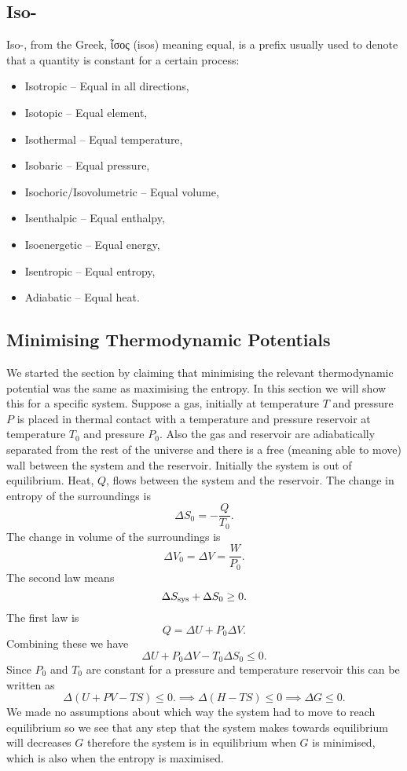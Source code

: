     \subsection{Iso-}
    Iso-, from the Greek, \textgreek{ἶσος} (isos) meaning equal, is a prefix usually used to denote that a quantity is constant for a certain process:
    \begin{itemize}
        \item Isotropic -- Equal in all directions,
        \item Isotopic -- Equal element,
        \item Isothermal -- Equal temperature,
        \item Isobaric -- Equal pressure,
        \item Isochoric/Isovolumetric -- Equal volume,
        \item Isenthalpic -- Equal enthalpy,
        \item Isoenergetic -- Equal energy,
        \item Isentropic -- Equal entropy,
        \item Adiabatic -- Equal heat.
    \end{itemize}

    \subsection{Minimising Thermodynamic Potentials}
    We started the section by claiming that minimising the relevant thermodynamic potential was the same as maximising the entropy.
    In this section we will show this for a specific system.
    Suppose a gas, initially at temperature \(T\) and pressure \(P\) is placed in thermal contact with a temperature and pressure reservoir at temperature \(T_0\) and pressure \(P_0\).
    Also the gas and reservoir are adiabatically separated from the rest of the universe and there is a free (meaning able to move) wall between the system and the reservoir.
    Initially the system is out of equilibrium.
    Heat, \(Q\), flows between the system and the reservoir.
    The change in entropy of the surroundings is
    \[\Delta S_0 = -\frac{Q}{T_0}.\]
    The change in volume of the surroundings is
    \[\Delta V_0 = \Delta V = \frac{W}{P_0}.\]
    The second law means
    \[\Delta S_{\mathrm{sys}} + \Delta S_0 \ge 0.\]
    The first law is
    \[Q = \Delta U + P_0\Delta V.\]
    Combining these we have
    \[\Delta U + P_0\Delta V - T_0\Delta S_0 \le 0.\]
    Since \(P_0\) and \(T_0\) are constant for a pressure and temperature reservoir this can be written as
    \[\Delta(U + PV - TS) \le 0. \implies \Delta(H - TS) \le 0 \implies \Delta G \le 0.\]
    We made no assumptions about which way the system had to move to reach equilibrium so we see that any step that the system makes towards equilibrium will decreases \(G\) therefore the system is in equilibrium when \(G\) is minimised, which is also when the entropy is maximised.
    
